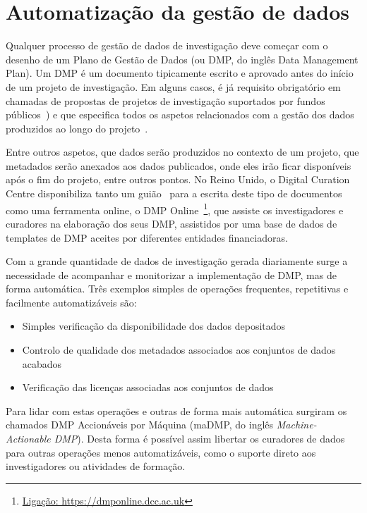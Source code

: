 \documentclass[sigconf,nonacm]{acmart}
\begin{document}
\section{Automatização da gestão de dados}

Qualquer processo de gestão de dados de investigação deve começar com o desenho de um Plano de Gestão de Dados (ou DMP, do inglês Data Management Plan). Um DMP é um documento tipicamente escrito e aprovado antes do início de um projeto de investigação. Em alguns casos, é já requisito obrigatório em chamadas de propostas de projetos de investigação suportados por fundos públicos~\cite{Foundation2011}) e que especifica todos os aspetos relacionados com a gestão dos dados produzidos ao longo do projeto~\cite{}.  

Entre outros aspetos, que dados serão produzidos no contexto de um projeto, que metadados serão anexados aos dados publicados, onde eles irão ficar disponíveis após o fim do projeto, entre outros pontos. No Reino Unido, o Digital Curation Centre disponibiliza tanto um guião~\cite{jones_dmp} para a escrita deste tipo de documentos como uma ferramenta online, o DMP Online~\footnote{\url{Ligação: https://dmponline.dcc.ac.uk}}, que assiste os investigadores e curadores na elaboração dos seus DMP, assistidos por uma base de dados de templates de DMP aceites por diferentes entidades financiadoras.

Com a grande quantidade de dados de investigação gerada diariamente surge a necessidade de acompanhar e monitorizar a implementação de DMP, mas de forma automática. Três exemplos simples de operações frequentes, repetitivas e facilmente automatizáveis são: 

\begin{itemize}
    \item Simples verificação da disponibilidade dos dados depositados
    \item Controlo de qualidade dos metadados associados aos conjuntos de dados acabados
    \item Verificação das licenças associadas aos conjuntos de dados
\end{itemize}

Para lidar com estas operações e outras de forma mais automática surgiram os chamados DMP Accionáveis por Máquina (maDMP, do inglês \textit{Machine-Actionable DMP}). Desta forma é possível assim libertar os curadores de dados para outras operações menos automatizáveis, como o suporte direto aos investigadores ou atividades de formação.
\end{document}
